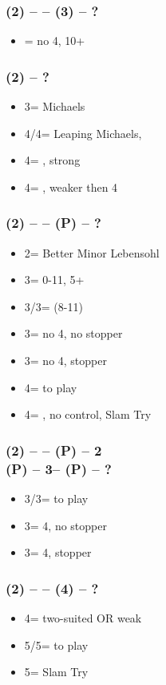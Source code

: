 \documentclass[12pt, a4paper]{article}
\begin{document}
\subsubsection*{(2\hearts) -- \dbl -- (3\hearts) -- ?}
\begin{itemize}
    \item \dbl = no 4\spades, 10+
\end{itemize}

\subsubsection*{(2\spades) -- ?}
\begin{itemize}
    \item 3\spades = Michaels
    \item 4\clubs/4\diams = Leaping Michaels, \gf
    \item 4\spades = \minor, strong
    \item 4\nt = \minor, weaker then 4\hearts
\end{itemize}

\subsubsection*{(2\spades) -- \dbl -- (P) -- ?}
\begin{itemize}
    \item 2\nt = Better Minor Lebensohl
    \item 3\clubs = 0-11, 5+\clubs
    \item 3\diams/3\hearts = \inv (8-11)
    \item 3\spades = no 4\hearts, no \spades stopper
    \item 3\nt = no 4\hearts, \spades stopper
    \item 4\hearts = to play
    \item 4\hearts = \minor, no \spades control, Slam Try \vimp
\end{itemize}

\subsubsection*{(2\spades) -- \dbl -- (P) -- 2\nt \\
                (P) -- 3\mins -- (P) -- ?}
\begin{itemize}
    \item 3\hearts/3\diams = to play
    \item 3\spades = 4\hearts, no \spades stopper
    \item 3\nt = 4\hearts, \spades stopper
\end{itemize}

\subsubsection*{(2\spades) -- \dbl -- (4\spades) -- ?}
\begin{itemize}
    \item 4\nt = two-suited OR weak \hearts
    \item 5\clubs/5\diams = to play
    \item 5\hearts = Slam Try
\end{itemize}

\end{document}
